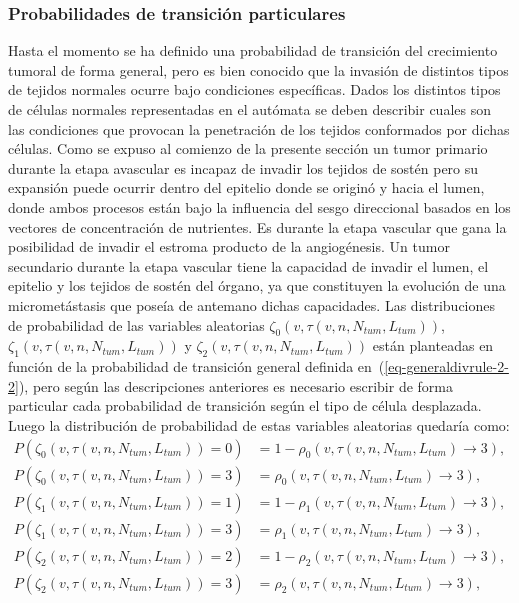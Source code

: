 \subsubsection{Probabilidades de transici\'on particulares}
Hasta el momento se ha definido una probabilidad de transici\'on del crecimiento tumoral de forma general, pero es bien conocido que la invasi\'on de distintos tipos de tejidos normales ocurre bajo condiciones espec\'ificas. Dados los distintos tipos de c\'elulas normales representadas en el aut\'omata se deben describir cuales son las condiciones que provocan la penetraci\'on de los tejidos conformados por dichas c\'elulas. Como se expuso al comienzo de la presente secci\'on un tumor primario durante la etapa avascular es incapaz de invadir los tejidos de sost\'en pero su expansi\'on puede ocurrir dentro del epitelio donde se origin\'o y hacia el lumen, donde ambos procesos est\'an bajo la influencia del sesgo direccional basados en los vectores de concentraci\'on de nutrientes. Es durante la etapa vascular que gana la posibilidad de invadir el estroma producto de la angiog\'enesis. Un tumor secundario durante la etapa vascular tiene la capacidad de invadir el lumen, el epitelio y los tejidos de sost\'en del \'organo, ya que constituyen la evoluci\'on de una micromet\'astasis que pose\'ia de antemano dichas capacidades. Las distribuciones de probabilidad de las variables aleatorias $\zeta_0(v,\tau(v,n,N_{tum},L_{tum}))$, $\zeta_1(v,\tau(v,n,N_{tum},L_{tum}))$ y $\zeta_2(v,\tau(v,n,N_{tum},L_{tum}))$ est\'an planteadas en funci\'on de la probabilidad de transici\'on general definida en~(\ref{eq-generaldivrule-2-2}), pero seg\'un las descripciones anteriores es necesario escribir de forma particular cada probabilidad de transici\'on seg\'un el tipo de c\'elula desplazada. Luego la distribuci\'on de probabilidad de estas variables aleatorias quedar\'ia como:
\begin{subequations}
\begin{align}
P(\zeta_0(v,\tau(v,n,N_{tum},L_{tum}))=0) &= 1 - \rho_0(v,\tau(v,n,N_{tum},L_{tum}) \rightarrow 3),\\
P(\zeta_0(v,\tau(v,n,N_{tum},L_{tum}))=3) &= \rho_0(v,\tau(v,n,N_{tum},L_{tum}) \rightarrow 3),\\
P(\zeta_1(v,\tau(v,n,N_{tum},L_{tum}))=1) &= 1 - \rho_1(v,\tau(v,n,N_{tum},L_{tum}) \rightarrow 3),\\
P(\zeta_1(v,\tau(v,n,N_{tum},L_{tum}))=3) &= \rho_1(v,\tau(v,n,N_{tum},L_{tum}) \rightarrow 3),\\
P(\zeta_2(v,\tau(v,n,N_{tum},L_{tum}))=2) &= 1 - \rho_2(v,\tau(v,n,N_{tum},L_{tum}) \rightarrow 3),\\
P(\zeta_2(v,\tau(v,n,N_{tum},L_{tum}))=3) &= \rho_2(v,\tau(v,n,N_{tum},L_{tum}) \rightarrow 3),
\end{align}
\end{subequations}
